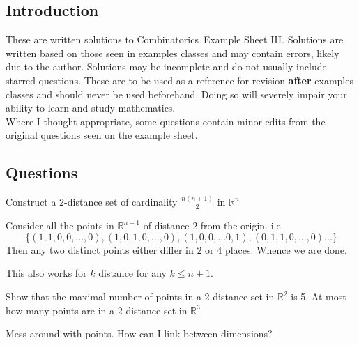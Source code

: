 \documentclass[a4paper]{article}
\def\ntitle{Combinatorics}
\def\nsheet{III}
\begin{document}
	
	
	\subsection*{Introduction}
	These are written solutions to \ntitle \ Example Sheet \nsheet. Solutions are written based on those seen in examples classes and may contain errors, likely due to the author. Solutions may be incomplete and do not usually include starred questions. These are to be used as a reference for revision \textbf{after} examples classes and should never be used beforehand. Doing so will severely impair your ability to learn and study mathematics.\\
	
	Where I thought appropriate, some questions contain minor edits from the original questions seen on the example sheet.
	\subsection*{Questions}

	
	\begin{question}[Question 2]
	Construct a 2-distance set of cardinality $\frac{n(n+1)}{2}$ in $\mathbb{R}^n$
	\end{question}
	\begin{answer}
	Consider all the points in $\mathbb{R}^{n+1}$ of distance 2 from the origin. i.e
	\[ \{(1,1,0,0,...,0), (1,0,1,0,...,0), (1,0,0,...0,1),(0,1,1,0,...,0)...\} \]
	Then any two distinct points either differ in $2$ or $4$ places. Whence we are done.
	\end{answer}
	\begin{remark}
	This also works for $k$ distance for any $k \leq n+1$.
	\end{remark}
	
	\begin{question}[Question 3]
	Show that the maximal number of points in a $2$-distance set in $\mathbb{R}^{2}$ is 5. At most how many points are in a $2$-distance set in $\mathbb{R}^{3}$
	\end{question}
	\begin{idea}
	Mess around with points. How can I link between dimensions?
	\end{idea}
\end{document}
